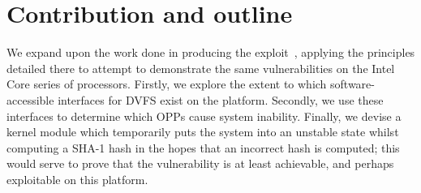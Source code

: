 \section{Contribution and outline}

We expand upon the work done in producing the \clkscrew{}
exploit~\cite{clkscrew}, applying the principles detailed there to attempt to
demonstrate the same vulnerabilities on the Intel Core series of processors.
Firstly, we explore the extent to which software-accessible interfaces for DVFS
exist on the platform. Secondly, we use these interfaces to determine which OPPs
cause system inability. Finally, we devise a kernel module which temporarily
puts the system into an unstable state whilst computing a SHA-1 hash in the
hopes that an incorrect hash is computed; this would serve to prove that the
\clkscrew{} vulnerability is at least achievable, and perhaps exploitable on
this platform.
